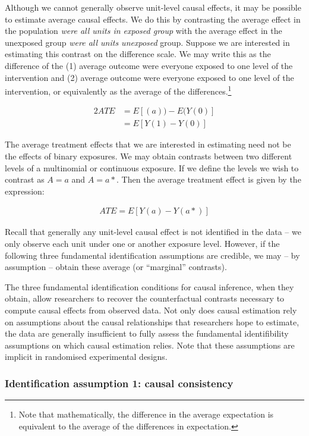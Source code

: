 \documentclass[
  singlecolumn]{report}
\begin{document}
Although we cannot generally observe unit-level causal effects, it may
be possible to estimate average causal effects. We do this by
contrasting the average effect in the population \emph{were all units in
exposed group} with the average effect in the unexposed group \emph{were
all units unexposed} group. Suppose we are interested in estimating this
contrast on the difference scale. We may write this as the difference of
the (1) average outcome were everyone exposed to one level of the
intervention and (2) average outcome were everyone exposed to one level
of the intervention, or equivalently as the average of the
differences.\footnote{Note that mathematically, the difference in the
  average expectation is equivalent to the average of the differences in
  expectation.}

\begin{alignat*}{2}
ATE & = E[(a)) - E(Y(0)]\\
& = E[Y(1) - Y(0)]
\end{alignat*}

The average treatment effects that we are interested in estimating need
not be the effects of binary exposures. We may obtain contrasts between
two different levels of a multinomial or continuous exposure. If we
define the levels we wish to contrast as \(A = a\) and \(A = a*\). Then
the average treatment effect is given by the expression:

   \begin{align*}
    ATE = E[Y(a) - Y(a*)]
    \end{align*}

Recall that generally any unit-level causal effect is not identified in
the data -- we only observe each unit under one or another exposure
level. However, if the following three fundamental identification
assumptions are credible, we may -- by assumption -- obtain these
average (or ``marginal'' contrasts).

The three fundamental identification conditions for causal inference,
when they obtain, allow researchers to recover the counterfactual
contrasts necessary to compute causal effects from observed data. Not
only does causal estimation rely on assumptions about the causal
relationships that researchers hope to estimate, the data are generally
insufficient to fully assess the fundamental identifibility assumptions
on which causal estimation relies. Note that these assumptions are
implicit in randomised experimental designs.

\hypertarget{identification-assumption-1-causal-consistency}{%
\subsubsection{Identification assumption 1: causal
consistency}\label{identification-assumption-1-causal-consistency}}
\end{document}
